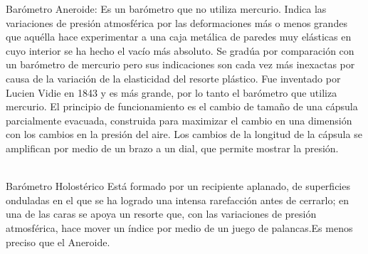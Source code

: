 \begin{compactitem}
	
	\item Barómetro Aneroide:
	Es un barómetro que no utiliza mercurio. Indica las variaciones de presión atmosférica por las deformaciones más o menos grandes que aquélla hace experimentar a una caja metálica de paredes muy elásticas en cuyo interior se ha hecho el vacío más absoluto. Se gradúa por comparación con un barómetro de mercurio pero sus indicaciones son cada vez más inexactas por causa de la variación de la elasticidad del resorte plástico. Fue inventado por Lucien Vidie en 1843 y es más grande, por lo tanto el barómetro que utiliza mercurio. El principio de funcionamiento es el cambio de tamaño de una cápsula parcialmente evacuada, construida para maximizar el cambio en una dimensión con los cambios en la presión del aire. Los cambios de la longitud de la cápsula se amplifican por medio de un brazo a un dial, que permite mostrar la presión.\\
	\
	\item Barómetro Holostérico 
	Está formado por un recipiente aplanado, de superficies onduladas en el que se ha logrado una intensa rarefacción antes de cerrarlo; en una de las caras se apoya un resorte que, con las variaciones de presión atmosférica, hace mover un índice por medio de un juego de palancas.Es menos preciso que el Aneroide.
	
	
	
\end{compactitem}